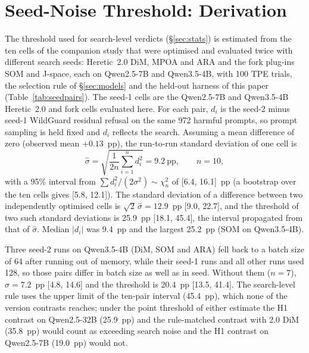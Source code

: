 \section{Seed-Noise Threshold: Derivation}
\label{app:seednoise}

The threshold used for search-level verdicts (\S\ref{sec:stats}) is estimated from the ten cells of the companion study
\cite{young2026harder} that were optimised and evaluated twice with different search seeds: Heretic~2.0 DiM, MPOA and
ARA and the fork plug-ins SOM and J-space, each on Qwen2.5-7B and Qwen3.5-4B, with 100 TPE trials, the selection rule of
\S\ref{sec:models} and the held-out harness of this paper (Table~\ref{tab:seedpairs}). The seed-1 cells are the
Qwen2.5-7B and Qwen3.5-4B Heretic~2.0 and fork cells evaluated here. For each pair, $d_i$ is the seed-2 minus seed-1
WildGuard residual refusal on the same 972 harmful prompts, so prompt sampling is held fixed and $d_i$ reflects the
search. Assuming a mean difference of zero (observed mean $+0.13$~pp), the run-to-run standard deviation of one cell is
\[
\hat\sigma=\sqrt{\frac{1}{2n}\sum_{i=1}^{n} d_i^2}=9.2~\text{pp}, \qquad n=10,
\]
with a 95\% interval from $\sum d_i^2/(2\sigma^2)\sim\chi^2_n$ of [6.4, 16.1]~pp (a bootstrap over the ten cells gives
[5.8, 12.1]). The standard deviation of a difference between two independently optimised cells is
$\sqrt{2}\,\hat\sigma=12.9$~pp [9.0, 22.7], and the threshold of two such standard deviations is 25.9~pp [18.1, 45.4],
the interval propagated from that of $\hat\sigma$. Median $|d_i|$ was 9.4~pp and the largest 25.2~pp (SOM on
Qwen3.5-4B).

Three seed-2 runs on Qwen3.5-4B (DiM, SOM and ARA) fell back to a batch size of 64 after running out of memory, while
their seed-1 runs and all other runs used 128, so those pairs differ in batch size as well as in seed. Without them
($n=7$), $\hat\sigma=7.2$~pp [4.8, 14.6] and the threshold is 20.4~pp [13.5, 41.4]. The search-level rule uses the
upper limit of the ten-pair interval (45.4~pp), which none of the version contrasts reaches; under the point threshold
of either estimate the H1 contrast on Qwen2.5-32B (25.9~pp) and the rule-matched contrast with 2.0 DiM (35.8~pp) would
count as exceeding search noise and the H1 contrast on Qwen2.5-7B (19.0~pp) would not.

